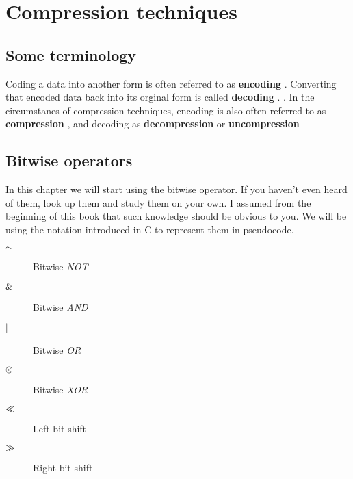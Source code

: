 \begin{comment}
  
\end{comment}

\chapter{Compression techniques}
\label{cha:digital-image}

\begin{refsection}

\section{Some terminology}
\label{sec:some-terminology}

Coding a data into another form is often referred to as
\textbf{encoding} . Converting that encoded data back
into its orginal form is called \textbf{decoding}
. . In the
circumstanes of compression techniques, encoding is also often
referred to as \textbf{compression} , and decoding as
\textbf{decompression}  or \textbf{uncompression} 


\section{Bitwise operators}
\label{sec:bitwise-operators}

In this chapter we will start using the bitwise operator. If you
haven't even heard of them, look up them and study them on your own. I
assumed from the beginning of this book that such knowledge should be
obvious to you. We will be using the notation introduced in C to
represent them in pseudocode.

\begin{description}
\item[$\mathord{\sim}$] Bitwise \textit{NOT}
\item[$\mathrel{\&}$] Bitwise \textit{AND}
\item[$\mathrel{|}$] Bitwise \textit{OR}
\item[$\mathrel{\otimes}$] Bitwise \textit{XOR}
\item[$\ll$] Left bit shift
\item[$\gg$] Right bit shift
\end{description}


\end{refsection}

